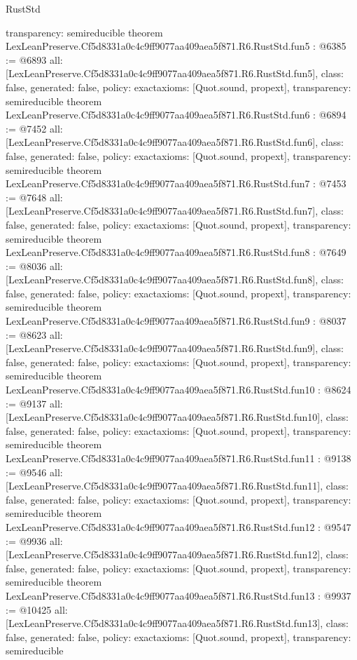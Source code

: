 \begin{lexlean}{RustStd}
\begin{coremodule}
{  transparency: semireducible
}
theorem LexLeanPreserve.Cf5d8331a0c4c9ff9077aa409aea5f871.R6.RustStd.fun5 : @6385 := @6893 {
  all: [LexLeanPreserve.Cf5d8331a0c4c9ff9077aa409aea5f871.R6.RustStd.fun5],
  class: false,
  generated: false,
  policy: exact{axioms: [Quot.sound, propext]},
  transparency: semireducible
}
theorem LexLeanPreserve.Cf5d8331a0c4c9ff9077aa409aea5f871.R6.RustStd.fun6 : @6894 := @7452 {
  all: [LexLeanPreserve.Cf5d8331a0c4c9ff9077aa409aea5f871.R6.RustStd.fun6],
  class: false,
  generated: false,
  policy: exact{axioms: [Quot.sound, propext]},
  transparency: semireducible
}
theorem LexLeanPreserve.Cf5d8331a0c4c9ff9077aa409aea5f871.R6.RustStd.fun7 : @7453 := @7648 {
  all: [LexLeanPreserve.Cf5d8331a0c4c9ff9077aa409aea5f871.R6.RustStd.fun7],
  class: false,
  generated: false,
  policy: exact{axioms: [Quot.sound, propext]},
  transparency: semireducible
}
theorem LexLeanPreserve.Cf5d8331a0c4c9ff9077aa409aea5f871.R6.RustStd.fun8 : @7649 := @8036 {
  all: [LexLeanPreserve.Cf5d8331a0c4c9ff9077aa409aea5f871.R6.RustStd.fun8],
  class: false,
  generated: false,
  policy: exact{axioms: [Quot.sound, propext]},
  transparency: semireducible
}
theorem LexLeanPreserve.Cf5d8331a0c4c9ff9077aa409aea5f871.R6.RustStd.fun9 : @8037 := @8623 {
  all: [LexLeanPreserve.Cf5d8331a0c4c9ff9077aa409aea5f871.R6.RustStd.fun9],
  class: false,
  generated: false,
  policy: exact{axioms: [Quot.sound, propext]},
  transparency: semireducible
}
theorem LexLeanPreserve.Cf5d8331a0c4c9ff9077aa409aea5f871.R6.RustStd.fun10 : @8624 := @9137 {
  all: [LexLeanPreserve.Cf5d8331a0c4c9ff9077aa409aea5f871.R6.RustStd.fun10],
  class: false,
  generated: false,
  policy: exact{axioms: [Quot.sound, propext]},
  transparency: semireducible
}
theorem LexLeanPreserve.Cf5d8331a0c4c9ff9077aa409aea5f871.R6.RustStd.fun11 : @9138 := @9546 {
  all: [LexLeanPreserve.Cf5d8331a0c4c9ff9077aa409aea5f871.R6.RustStd.fun11],
  class: false,
  generated: false,
  policy: exact{axioms: [Quot.sound, propext]},
  transparency: semireducible
}
theorem LexLeanPreserve.Cf5d8331a0c4c9ff9077aa409aea5f871.R6.RustStd.fun12 : @9547 := @9936 {
  all: [LexLeanPreserve.Cf5d8331a0c4c9ff9077aa409aea5f871.R6.RustStd.fun12],
  class: false,
  generated: false,
  policy: exact{axioms: [Quot.sound, propext]},
  transparency: semireducible
}
theorem LexLeanPreserve.Cf5d8331a0c4c9ff9077aa409aea5f871.R6.RustStd.fun13 : @9937 := @10425 {
  all: [LexLeanPreserve.Cf5d8331a0c4c9ff9077aa409aea5f871.R6.RustStd.fun13],
  class: false,
  generated: false,
  policy: exact{axioms: [Quot.sound, propext]},
  transparency: semireducible
}
\end{coremodule}
\end{lexlean}
